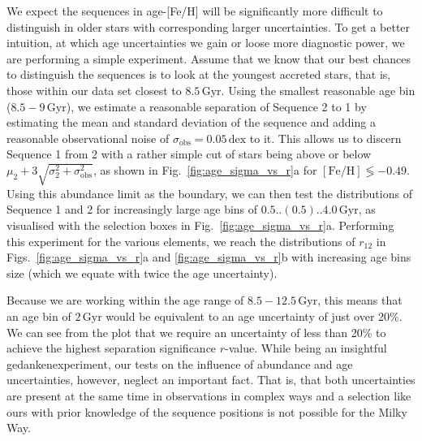\documentclass[fleqn,usenatbib]{mnras}
\begin{document}
We expect the sequences in age-[Fe/H] will be significantly more difficult to distinguish in older stars with corresponding larger uncertainties. To get a better intuition, at which age uncertainties we gain or loose more diagnostic power, we are performing a simple experiment. Assume that we know that our best chances to distinguish the sequences is to look at the youngest accreted stars, that is, those within our data set closest to $8.5\,\mathrm{Gyr}$. Using the smallest reasonable age bin ($8.5-9\,\mathrm{Gyr}$), we estimate a reasonable separation of Sequence 2 to 1 by estimating the mean and standard deviation of the sequence and adding a reasonable observational noise of $\sigma_\mathrm{obs} = 0.05\,\mathrm{dex}$ to it. This allows us to discern Sequence 1 from 2 with a rather simple cut of stars being above or below $\mu_2 + 3 \sqrt{\sigma_2^2 + \sigma_\mathrm{obs}^2}$, as shown in Fig.~\ref{fig:age_sigma_vs_r}a for $\mathrm{[Fe/H]} \lessgtr -0.49$. Using this abundance limit as the boundary, we can then test the distributions of Sequence 1 and 2 for increasingly large age bins of $0.5..(0.5)..4.0\,\mathrm{Gyr}$, as visualised with the selection boxes in Fig.~\ref{fig:age_sigma_vs_r}a. Performing this experiment for the various elements, we reach the distributions of $r_{12}$ in Figs.~\ref{fig:age_sigma_vs_r}a and \ref{fig:age_sigma_vs_r}b with increasing age bins size (which we equate with twice the age uncertainty).

Because we are working within the age range of $8.5-12.5\,\mathrm{Gyr}$, this means that an age bin of $2\,\mathrm{Gyr}$ would be equivalent to an age uncertainty of just over 20\%. We can see from the plot that we require an uncertainty of less than 20\% to achieve the highest separation significance $r$-value. While being an insightful gedankenexperiment, our tests on the influence of abundance and age uncertainties, however, neglect an important fact. That is, that both uncertainties are present at the same time in observations in complex ways and a selection like ours with prior knowledge of the sequence positions is not possible for the Milky Way.
\end{document}
